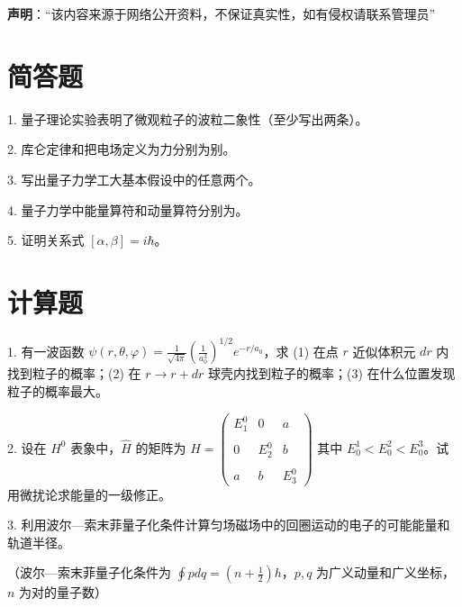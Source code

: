 
\textbf{声明}：“该内容来源于网络公开资料，不保证真实性，如有侵权请联系管理员”

\section*{简答题}

1. 量子理论实验表明了微观粒子的波粒二象性（至少写出两条）。

2. 库仑定律和把电场定义为力分别为别。

3. 写出量子力学工大基本假设中的任意两个。

4. 量子力学中能量算符和动量算符分别为。

5. 证明关系式 $[\alpha, \beta] = i \hbar$。

\section*{计算题}

1. 有一波函数 $\psi(r, \theta, \varphi) = \frac{1}{\sqrt{4 \pi}} \left( \frac{1}{a_0^3} \right)^{1/2} e^{-r/a_0}$，求 (1) 在点 $r$ 近似体积元 $dr$ 内找到粒子的概率；(2) 在 $r \to r + dr$ 球壳内找到粒子的概率；(3) 在什么位置发现粒子的概率最大。

2. 设在 $H^0$ 表象中，$\hat{H}$ 的矩阵为
$\hat{H} = \begin{pmatrix}E_1^0 & 0 & a \\\\0 & E_2^0 & b \\\\a & b & E_3^0\end{pmatrix}$
其中 $E_0^1 < E_0^2 < E_0^3$。试用微扰论求能量的一级修正。

3. 利用波尔—索末菲量子化条件计算匀场磁场中的回圈运动的电子的可能能量和轨道半径。

（波尔—索末菲量子化条件为 $\oint p dq = (n + \frac{1}{2}) h$，$p, q$ 为广义动量和广义坐标，$n$ 为对的量子数）